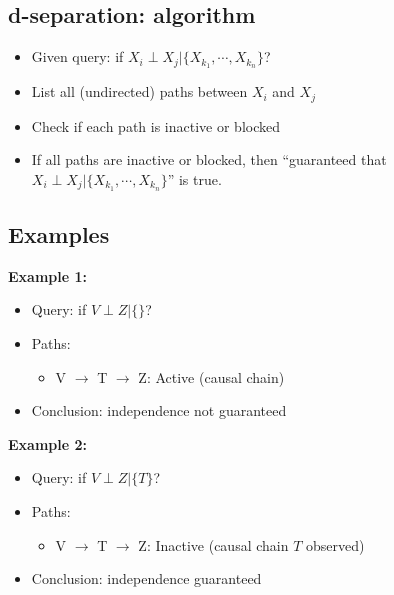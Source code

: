 \documentclass[10pt]{article}
\begin{document}
\subsection*{d-separation: algorithm}
\begin{itemize}
	\item Given query: if $X_i \perp X_j | \{X_{k_1}, \cdots, X_{k_n}\}$?
	\item List all (undirected) paths between $X_i$ and $X_j$
	\item Check if each path is inactive or blocked
	\item If all paths are inactive or blocked, then ``guaranteed that $X_i \perp X_j | \{X_{k_1}, \cdots, X_{k_n}\}$'' is true.
\end{itemize}

\subsection*{Examples}
\begin{center}
\end{center}
\textbf{Example 1:}
\begin{itemize}
	\item Query: if $V \perp Z | \{\}$?
	\item Paths: 
	\begin{itemize}
	    \item V $\rightarrow$ T $\rightarrow$ Z:  Active (causal chain)
    \end{itemize}
    \item Conclusion: independence not guaranteed
\end{itemize}
\textbf{Example 2:}
\begin{itemize}
	\item Query: if $V \perp Z | \{T\}$?
	\item Paths: 
	\begin{itemize}
	    \item V $\rightarrow$ T $\rightarrow$ Z:  Inactive (causal chain $T$ observed)
    \end{itemize}
    \item Conclusion: independence guaranteed
\end{itemize}
\end{document}
